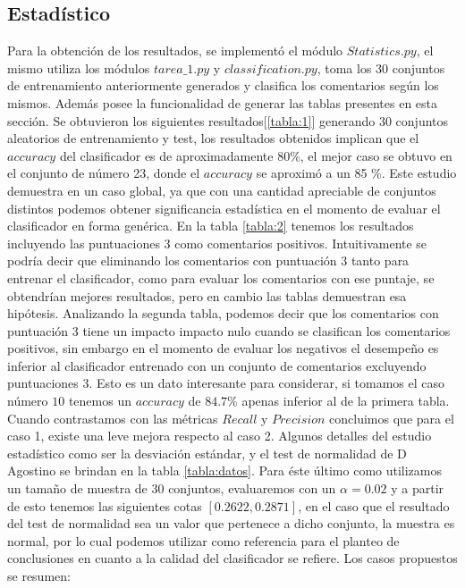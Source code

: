 \documentclass[12pt]{article}
\begin{document}
\subsection{Estadístico} \label{sub:estad}
Para la obtención de los resultados, se implementó el módulo $Statistics.py$, el mismo utiliza los módulos $tarea\_1.py$ y $classification.py$, toma los 30 conjuntos de entrenamiento anteriormente generados y clasifica los comentarios según los mismos. Además posee la funcionalidad de generar las tablas presentes en esta sección.
Se obtuvieron los siguientes resultados[\ref{tabla:1}] generando 30 conjuntos aleatorios de entrenamiento y test, los resultados obtenidos implican que el $accuracy$ del clasificador es de aproximadamente 80\%, el mejor caso se obtuvo en el conjunto de número 23, donde el $accuracy$ se aproximó a un 85 \%. Este estudio demuestra en un caso global, ya que con una cantidad apreciable de conjuntos distintos podemos obtener significancia estadística en el momento de evaluar el clasificador en forma genérica.
En la tabla \ref{tabla:2} tenemos los resultados incluyendo las puntuaciones 3 como comentarios positivos. Intuitivamente se podría decir que eliminando los comentarios con puntuación 3 tanto para entrenar el clasificador, como para evaluar los comentarios con ese puntaje, se obtendrían mejores resultados, pero en cambio las tablas demuestran esa hipótesis. Analizando la segunda tabla, podemos decir que los comentarios con puntuación 3 tiene un impacto impacto nulo cuando se clasifican los comentarios positivos, sin embargo en el momento de evaluar los negativos el desempeño es inferior al clasificador entrenado con un conjunto de comentarios excluyendo puntuaciones 3. Esto es un dato interesante para considerar, si tomamos el caso número $10$ tenemos un $accuracy$ de $84.7 \%$ apenas inferior al de la primera tabla. Cuando contrastamos con las métricas $Recall$ y $Precision$ concluimos que para el caso 1, existe una leve mejora respecto al caso 2.
Algunos detalles del estudio estadístico como ser la desviación estándar, y el test de normalidad de D Agostino se brindan en la tabla \ref{tabla:datos}. Para éste último como utilizamos un tamaño de muestra de 30 conjuntos, evaluaremos con un $\alpha = 0.02$ y a partir de esto tenemos las siguientes cotas  $[0.2622 , 0.2871]$, en el caso que el resultado del test de normalidad sea un valor que pertenece a dicho conjunto, la muestra es normal, por lo cual podemos utilizar como referencia para el planteo de conclusiones en cuanto a la calidad del clasificador se refiere.
Los casos propuestos se resumen:
\end{document}
